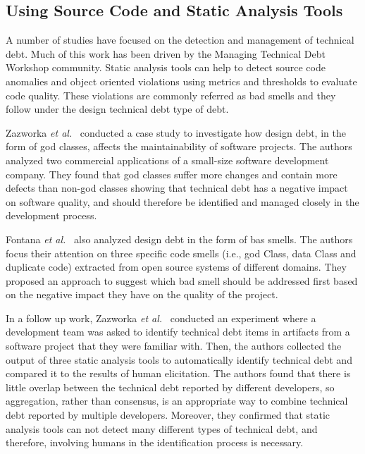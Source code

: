 \subsection{Using Source Code and Static Analysis Tools}

A number of studies have focused on the detection and management of technical debt. Much of this work has been driven by the Managing Technical Debt Workshop community. Static analysis tools can help to detect source code anomalies and object oriented violations using metrics and thresholds to evaluate code quality. These violations are commonly referred as bad smells and they follow under the design technical debt type of debt. 

Zazworka \textit{et al.}~\cite{Zazworka2011MTD} conducted a case study to investigate how design debt, in the form of god classes, affects the maintainability of software projects. The authors analyzed two commercial applications of a small-size software development company. They found that god classes suffer more changes and contain more defects than non-god classes showing that technical debt has a negative impact on software quality, and should therefore be identified and managed closely in the development process.

Fontana \textit{et al.}~\cite{Fontana2012MTD} also analyzed design debt in the form of bas smells. The authors focus their attention on three specific code smells (i.e., god Class, data Class and duplicate code) extracted from open source systems of different domains. They proposed an approach to suggest which bad smell should be addressed first based on the negative impact they have on the quality of the project.

In a follow up work, Zazworka \textit{et al.}~\cite{Zazworka2013CSE} conducted an experiment where a development team was asked to identify technical debt items in artifacts from a software project that they were familiar with. Then, the authors collected the output of three static analysis tools to automatically identify technical debt and compared it to the results of human elicitation. The authors found that there is little overlap between the technical debt reported by different developers, so aggregation, rather than consensus, is an appropriate way to combine technical debt reported by multiple developers. Moreover, they confirmed that static analysis tools can not detect many different types of technical debt, and therefore, involving humans in the identification process is necessary. 

